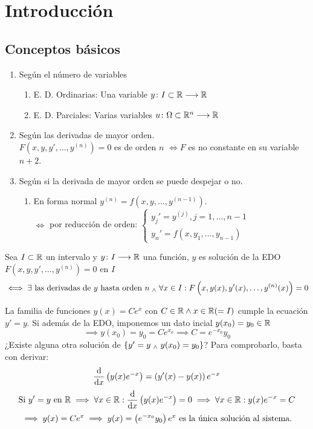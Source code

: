 \section{Introducción}
\subsection{Conceptos básicos}
\begin{defn}
	\item[]
	\begin{enumerate}[topsep=1pt, itemsep=1pt,parsep=3pt]
		\item Según el número de variables
		      \begin{enumerate}[topsep=1pt, itemsep=1pt,parsep=3pt]
			      \item E. D. Ordinarias: Una variable $y \colon I\subset \mathbb{R} \longrightarrow \mathbb{R}$
			      \item E. D. Parciales: Varias variables $u \colon \Omega \subset \mathbb{R}^{n} \longrightarrow \mathbb{R}$
		      \end{enumerate}
		\item Según las derivadas de mayor orden. \\$F\left(x,y,y', \dots, y^{(n)}\right)=0$ es de orden $n$ \(\iff F\) es no constante en su variable $n+2$.
		\item Según si la derivada de mayor orden se puede despejar o no.
		      \begin{enumerate}[topsep=1pt, itemsep=1pt,parsep=3pt]
			      \item En forma normal $y^{(n)} = f(x, y, \dots, y^{(n-1)})$.
			            \\ $\iff$ por reducción de orden:
			            $\begin{cases}
					            y_j' = y^{(j)}, j=1, \dots, n-1 \\
					            y_n'=f(x,y_1, \dots, y_{n-1})
				            \end{cases}$
		      \end{enumerate}
	\end{enumerate}
\end{defn}
\begin{defn}
	Sea $I\subset \mathbb{R}$ un intervalo y $y \colon I \longrightarrow \mathbb{R}$ una función, $y$ es solución de la EDO $F\left(x,y,y', \dots, y^{(n)}\right)=0$ en $I$
	\[\iff \exists \text{ las derivadas de } y \text{ hasta orden } n \; _{\wedge} \; \forall x \in I : F\left(x,y(x),y'(x), \dots, y^{(n)}(x)\right)=0\]
\end{defn}
\begin{ejem}
	La familia de funciones $y(x)=Ce^x$ con $C\in \mathbb{R} \wedge x\in \mathbb{R} (=I)$ cumple la ecuación $y'=y$. Si además de la EDO, imponemos un dato incial $y(x_0)=y_0 \in \mathbb{R}$
	\[\implies y(x_0)=y_0=Ce^{x_0} \implies C=e^{-x_0}y_0\]
	¿Existe alguna otra solución de $\{y'=y \; _{\wedge} \; y(x_0)=y_0\}$?
	Para comprobarlo, basta con derivar:
	\[\odv{}{x}\left(y(x)e^{-x}\right)=\left(y'(x) - y(x)\right)e^{-x}\]
	\[\tex{Si } y'=y \tex{ en } \R \implies \forall x \in \R : \odv{}{x}\left(y(x)e^{-x}\right)=0 \implies \forall x \in \R : y(x)e^{-x} = C\]
	\[\implies y(x)=Ce^x \implies y(x)=\left(e^{-x_0}y_0\right)e^x \text{ es la única solución al sistema.}\]
\end{ejem}

